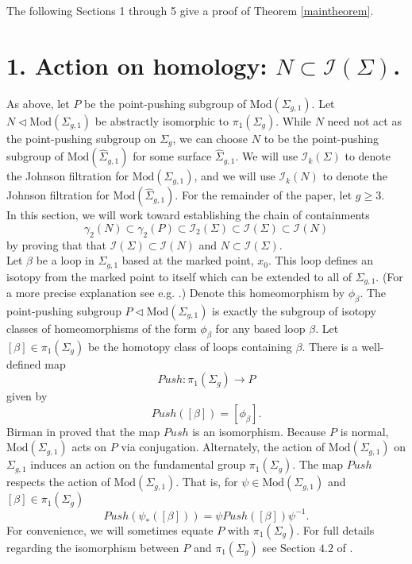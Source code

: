 \documentclass[a4paper]{amsproc}
\theoremstyle{TheoremNum}
\theoremstyle{Theorembold}
\theoremstyle{TheoremboldDef}
\theoremstyle{TheoremboldRem}
\theoremstyle{TheoremboldRem}
\begin{document}
The following Sections 1 through 5 give a proof of Theorem \ref{maintheorem}. 
\section*{1. Action on homology: $N\subset {{\mathcal{I}}(\Sigma)}$.}
\addtocounter{section}{1}
\setcounter{subsection}{0} As above, let $P$ be the point-pushing subgroup of ${\text{Mod}(\Sigma_{g,1})}$. Let $N\triangleleft{\text{Mod}(\Sigma_{g,1})}$ be abstractly isomorphic to ${\pi_1(\Sigma_g)}$. While $N$ need not act as the point-pushing subgroup on ${\Sigma_{g}}$, we can choose $N$ to be the point-pushing subgroup of ${\text{Mod}(\hat{\Sigma}_{g,1})}$ for some surface $\hat{\Sigma}_{g,1}$. We will use ${{\mathcal{I}}_k(\Sigma)}$ to denote the Johnson filtration for ${\text{Mod}(\Sigma_{g,1})}$, and we will use ${{\mathcal{I}}_k(N)}$ to denote the Johnson filtration for ${\text{Mod}(\hat{\Sigma}_{g,1})}$. For the remainder of the paper, let $g{\geqslant} 3$. \\

 In this section, we will work toward establishing the chain of containments \[\gamma_2(N)\subset\gamma_2(P)\subset{{\mathcal{I}}_2(\Sigma)}\subset{{\mathcal{I}}(\Sigma)}\subset{{\mathcal{I}}(N)}\]   by proving that that ${{\mathcal{I}}(\Sigma)}\subset{{\mathcal{I}}(N)}$ and $N\subset{{\mathcal{I}}(\Sigma)}$.\\
 
 Let $\beta$ be a loop in ${\Sigma_{g,1}}$ based at the marked point, $x_0$. This loop defines an isotopy from the marked point to itself which can be extended to all of ${\Sigma_{g,1}}$. (For a more precise explanation see e.g. \cite[Setc.4.2]{primer}.) Denote this homeomorphism by $\phi_\beta$. The point-pushing subgroup $ P\triangleleft{\text{Mod}(\Sigma_{g,1})}$ is exactly the subgroup of isotopy classes of homeomorphisms of the form $\phi_\beta$ for any based loop $\beta$. Let $[\beta]\in {\pi_1(\Sigma_g)}$ be the homotopy class of loops containing $\beta$. There is a well-defined map 
						\[Push:{\pi_1(\Sigma_g)}\to P\] 
							given by 
						\[Push([\beta])= [\phi_\beta].\]
Birman in \cite{birman} proved that the map $Push$ is an isomorphism.  Because $P$ is normal, ${\text{Mod}(\Sigma_{g,1})}$ acts on $P$ via conjugation. Alternately, the action of ${\text{Mod}(\Sigma_{g,1})}$ on ${\Sigma_{g,1}}$ induces an action on the fundamental group ${\pi_1(\Sigma_g)}$. The map $Push$ respects the action of ${\text{Mod}(\Sigma_{g,1})}$. That is, for $\psi\in{\text{Mod}(\Sigma_{g,1})}$ and $[\beta]\in {\pi_1(\Sigma_g)}$
				\begin{equation*}
			\tag{$\dagger$} Push(\psi_{\ast}([\beta]))=\psi Push([\beta])\psi^{-1}.	\end{equation*}
For convenience, we will sometimes equate $P$ with ${\pi_1(\Sigma_g)}$. For full details regarding the isomorphism between $P$ and ${\pi_1(\Sigma_g)}$ see Section $4.2$ of \cite{primer}.\\
\end{document}
